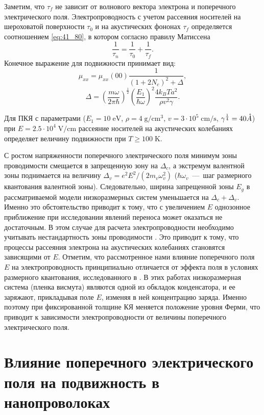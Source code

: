 Заметим, что $\tau_f $ не зависит от волнового вектора электрона и поперечного электрического поля. Электропроводность с учетом рассеяния носителей на шероховатой поверхности $\tau_0 $ и на акустических фононах $\tau_f $ определяется соотношением \eqref{eq:41_80}, в котором согласно правилу Матиссена
\[
	\frac{1}{\tau_n } =\frac{1}{\tau_0 } +\frac{1}{\tau_f } .
\]
Конечное выражение для подвижности принимает вид:
\begin{equation} \label{eq:41_110}
	\mu_{xx} =\mu _{xx}(00)\frac{1}{\left(1+2N_c \right)^2 +\Delta } ,
\end{equation}
\[
	\Delta =\left(\frac{m\omega }{2\pi \hbar } \right)^{\frac{1}{2} } \left(\frac{E_1 }{\hbar \omega } \right)^2 \frac{4k_B T a^2 }{\rho v^2 \gamma }.
\]

Для ПКЯ с параметрами ($E_1 = 10\mathrm{\; eV}$, $\rho =4 \mathrm{\;g/cm^3}$, $v=3\cdot 10^5 \mathrm{\;cm/s}$, $\gamma^{\frac{1}{4}} = 40 \AA$) при $E=2.5\cdot 10^4 \mathrm{\;V/cm}$ рассеяние носителей на акустических колебаниях определяет величину подвижности при $T \ge 100 \mathrm{\; K}$.

С ростом напряженности поперечного электрического поля минимум зоны проводимости смещается в запрещенную зону на $\Delta_c $, а экстремум валентной зоны поднимается на величину $\Delta_v =e^2 E^2  / (2m_v  \omega_v^2 )$ ($\hbar \omega_v $~---~шаг размерного квантования валентной зоны). Следовательно, ширина запрещенной зоны $E_g$ в рассматриваемой модели низкоразмерных систем уменьшается на $\Delta_c +\Delta_v $. Именно это обстоятельство приводит к тому, что с увеличением $E$ однозонное приближение при исследовании явлений переноса может оказаться не достаточным. В этом случае для расчета электропроводности необходимо учитывать нестандартность зоны проводимости \cite{Lax1960,Cohen1961}. Это приводит к тому, что процессы рассеяния электрона на акустических колебаниях становятся зависящими от $E$. Отметим, что рассмотренное нами влияние поперечного поля $E$ на электропроводность принципиально отличается от эффекта поля в условиях размерного квантования, исследованного в \cite{Sandomirsky1967,Butenko1998}. В этих работах низкоразмерная система (пленка висмута) являются одной из обкладок конденсатора, и ее заряжают, прикладывая поле $E$, изменяя в ней концентрацию заряда. Именно поэтому при фиксированной толщине КЯ меняется положение уровня Ферми, что приводит к зависимости электропроводности от величины поперечного электрического поля.

\section{Влияние поперечного электрического поля на подвижность в нанопроволоках} \label{sect4_2}

